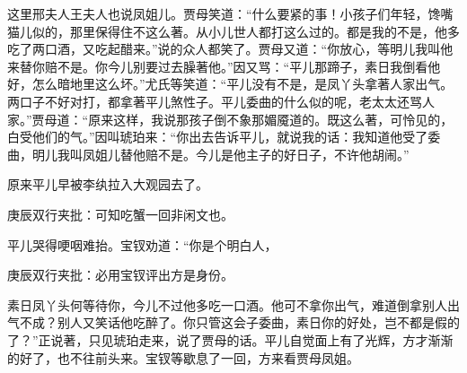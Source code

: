 \begin{parag}
    这里邢夫人王夫人也说凤姐儿。贾母笑道：“什么要紧的事！小孩子们年轻，馋嘴猫儿似的，那里保得住不这么著。从小儿世人都打这么过的。都是我的不是，他多吃了两口酒，又吃起醋来。”说的众人都笑了。贾母又道：“你放心，等明儿我叫他来替你赔不是。你今儿别要过去臊著他。”因又骂：“平儿那蹄子，素日我倒看他好，怎么暗地里这么坏。”尤氏等笑道：“平儿没有不是，是凤丫头拿著人家出气。两口子不好对打，都拿著平儿煞性子。平儿委曲的什么似的呢，老太太还骂人家。”贾母道：“原来这样，我说那孩子倒不象那媚魇道的。既这么著，可怜见的，白受他们的气。”因叫琥珀来：“你出去告诉平儿，就说我的话：我知道他受了委曲，明儿我叫凤姐儿替他赔不是。今儿是他主子的好日子，不许他胡闹。”
\end{parag}


\begin{parag}
    原来平儿早被李纨拉入大观园去了。\begin{note}庚辰双行夹批：可知吃蟹一回非闲文也。\end{note}平儿哭得哽咽难抬。宝钗劝道：“你是个明白人，\begin{note}庚辰双行夹批：必用宝钗评出方是身份。\end{note}素日凤丫头何等待你，今儿不过他多吃一口酒。他可不拿你出气，难道倒拿别人出气不成？别人又笑话他吃醉了。你只管这会子委曲，素日你的好处，岂不都是假的了？”正说著，只见琥珀走来，说了贾母的话。平儿自觉面上有了光辉，方才渐渐的好了，也不往前头来。宝钗等歇息了一回，方来看贾母凤姐。
\end{parag}


